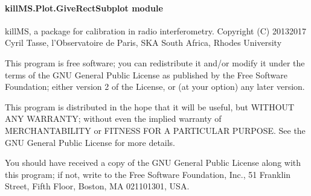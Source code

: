 \documentclass[letterpaper,10pt,english]{sphinxmanual}
\begin{document}
\paragraph{killMS.Plot.GiveRectSubplot module}
\label{\detokenize{api/killMS.Plot:module-killMS.Plot.GiveRectSubplot}}\label{\detokenize{api/killMS.Plot:killms-plot-giverectsubplot-module}}
\sphinxAtStartPar
killMS, a package for calibration in radio interferometry.
Copyright (C) 2013\sphinxhyphen{}2017  Cyril Tasse, l’Observatoire de Paris,
SKA South Africa, Rhodes University

\sphinxAtStartPar
This program is free software; you can redistribute it and/or
modify it under the terms of the GNU General Public License
as published by the Free Software Foundation; either version 2
of the License, or (at your option) any later version.

\sphinxAtStartPar
This program is distributed in the hope that it will be useful,
but WITHOUT ANY WARRANTY; without even the implied warranty of
MERCHANTABILITY or FITNESS FOR A PARTICULAR PURPOSE.  See the
GNU General Public License for more details.

\sphinxAtStartPar
You should have received a copy of the GNU General Public License
along with this program; if not, write to the Free Software
Foundation, Inc., 51 Franklin Street, Fifth Floor, Boston, MA  02110\sphinxhyphen{}1301, USA.
\end{document}
